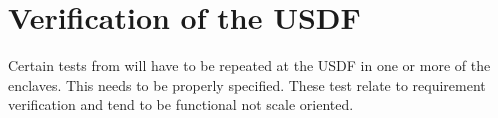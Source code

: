 \section{Verification of the \gls{USDF}} \label{sec:verification}


Certain tests from  will have to be repeated at the \gls{USDF} in one or more of the enclaves.
This needs to be properly specified. These test relate to requirement verification and tend to be functional not scale oriented.


